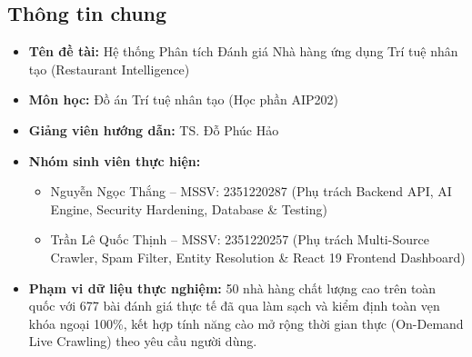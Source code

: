 \documentclass[12pt, a4paper]{article}
\begin{document}
\subsection{Thông tin chung}
\begin{itemize}[leftmargin=1.2cm]
    \item \textbf{Tên đề tài:} Hệ thống Phân tích Đánh giá Nhà hàng ứng dụng Trí tuệ nhân tạo (Restaurant Intelligence)
    \item \textbf{Môn học:} Đồ án Trí tuệ nhân tạo (Học phần AIP202)
    \item \textbf{Giảng viên hướng dẫn:} TS. Đỗ Phúc Hảo
    \item \textbf{Nhóm sinh viên thực hiện:}
    \begin{itemize}
        \item Nguyễn Ngọc Thắng -- MSSV: 2351220287 (Phụ trách Backend API, AI Engine, Security Hardening, Database \& Testing)
        \item Trần Lê Quốc Thịnh -- MSSV: 2351220257 (Phụ trách Multi-Source Crawler, Spam Filter, Entity Resolution \& React 19 Frontend Dashboard)
    \end{itemize}
    \item \textbf{Phạm vi dữ liệu thực nghiệm:} 50 nhà hàng chất lượng cao trên toàn quốc với 677 bài đánh giá thực tế đã qua làm sạch và kiểm định toàn vẹn khóa ngoại 100\%, kết hợp tính năng cào mở rộng thời gian thực (On-Demand Live Crawling) theo yêu cầu người dùng.
\end{itemize}
\end{document}
